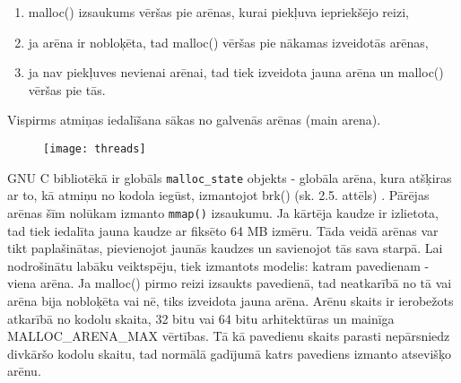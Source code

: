 \begin{enumerate}
\item malloc() izsaukums vēršas pie arēnas, kurai piekļuva iepriekšējo reizi,
\item ja arēna ir nobloķēta, tad malloc() vēršas pie nākamas izveidotās arēnas,
\item ja nav piekļuves nevienai arēnai, tad tiek izveidota jauna arēna un malloc() vēršas pie tās.
\end{enumerate}
Vispirms atmiņas iedalīšana sākas no galvenās arēnas (main arena). 
\begin{figure}[h]
\begin{center}
\texttt{[image: threads]}
\end{center}
\caption{\textbf{\fontsize{11}{12}\selectfont {Arēnas GNU C bibliotēkā }}}
\end{figure}

GNU C bibliotēkā ir globāls \texttt{malloc\_state} objekts - globāla arēna, kura atšķiras ar to, kā atmiņu no kodola iegūst, izmantojot brk() (sk. 2.5. attēls) \cite{AMM}. 
Pārējas arēnas šīm nolūkam izmanto \texttt{mmap()} izsaukumu. 
Ja kārtēja kaudze ir izlietota, tad tiek iedalīta jauna kaudze ar fiksēto 64 MB izmēru.
Tāda veidā arēnas var tikt paplašinātas, pievienojot jaunās kaudzes un savienojot tās sava starpā.
Lai nodrošinātu labāku veiktspēju, tiek izmantots modelis: katram pavedienam - viena arēna. 
Ja malloc() pirmo reizi izsaukts pavedienā, tad neatkarībā no tā vai arēna bija nobloķēta vai nē, tiks izveidota jauna arēna.
Arēnu skaits ir ierobežots atkarībā no kodolu skaita, 32 bitu vai 64 bitu arhitektūras un mainīga MALLOC\_ARENA\_MAX vērtības.
Tā kā pavedienu skaits parasti nepārsniedz divkāršo kodolu skaitu, tad normālā gadījumā katrs pavediens izmanto atsevišķo arēnu. 




